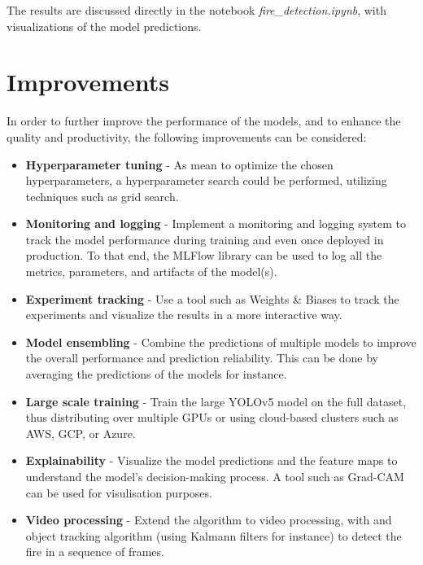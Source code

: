 \documentclass{article}
\begin{document}
The results are discussed directly in the notebook \textit{fire\_detection.ipynb}, with visualizations of the model predictions.

\newpage

\section{Improvements}

In order to further improve the performance of the models, and to enhance the quality and productivity, the following improvements can be considered:

\begin{itemize}
    \item \textbf{Hyperparameter tuning} - As mean to optimize the chosen hyperparameters, a hyperparameter search could be performed, utilizing techniques such as grid search.
    \item \textbf{Monitoring and logging} - Implement a monitoring and logging system to track the model performance during training and even once deployed in production. To that end, the MLFlow library can be used to log all the metrics, parameters, and artifacts of the model(s).
    \item \textbf{Experiment tracking} - Use a tool such as Weights \& Biases to track the experiments and visualize the results in a more interactive way.
    \item \textbf{Model ensembling} - Combine the predictions of multiple models to improve the overall performance and prediction reliability. This can be done by averaging the predictions of the models for instance.
    \item \textbf{Large scale training} - Train the large YOLOv5 model on the full dataset, thus distributing over multiple GPUs or using cloud-based clusters such as AWS, GCP, or Azure.
    \item \textbf{Explainability} - Visualize the model predictions and the feature maps to understand the model's decision-making process. A tool such as Grad-CAM can be used for visulisation purposes.
    \item \textbf{Video processing} - Extend the algorithm to video processing, with and object tracking algorithm (using Kalmann filters for instance) to detect the fire in a sequence of frames.
\end{itemize}
\end{document}
